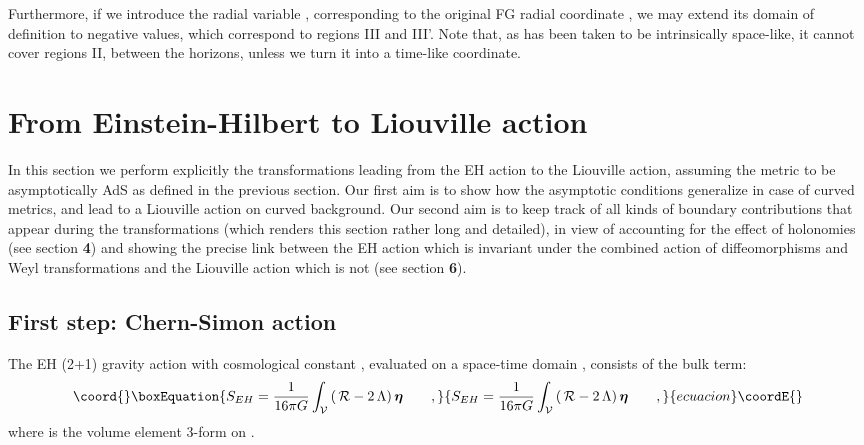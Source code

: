 \documentclass[a4paper,10pt]{article}
\begin{document}
Furthermore, if we introduce the radial variable 
\coordHE{}, corresponding to the original FG radial 
coordinate \cite{FG}, 
we may extend its domain of definition to  negative values, which 
correspond to  regions  III and III'. Note that, as \coordHE{} has been taken 
to be intrinsically space-like, it cannot cover regions II, between 
the horizons, unless we turn it into a time-like coordinate.  
  
\section{From Einstein-Hilbert to Liouville action} 

In this section we perform explicitly the transformations leading from
the EH action to the Liouville action, assuming the metric to be asymptotically
AdS as defined in the previous section. Our first aim is to show
how the asymptotic conditions generalize in case of curved metrics,
 and lead to a Liouville action on curved background.
Our second aim is to keep track of all kinds of boundary contributions
that appear during the 
transformations (which renders this section rather long and detailed), 
in view of accounting for the effect of holonomies (see section {\bf 4})
and showing the precise link between the
EH action which is invariant under the combined action
of diffeomorphisms and Weyl transformations and the Liouville action 
which is not (see section {\bf 6}). 

\subsection{First step: Chern-Simon action}

The EH (2+1) gravity action with cosmological  
constant \myHighlight{$\Lambda$}\coordHE{}, evaluated on a space-time domain \coordHE{}, 
consists of the bulk term: 
\begin{equation}\coord{}\boxEquation{ 
\label{SEH} 
S_{EH}=\frac 1 {16 \pi G} \int_{\cal V} \,  
   ( \, { \cal R} - 2 \, \Lambda ) 
       \, \boldsymbol{\eta} 
\qquad ,  
}{ 
S_{EH}=\frac 1 {16 \pi G} \int_{\cal V} \,  
   ( \, { \cal R} - 2 \, \Lambda ) 
       \, \boldsymbol{\eta} 
\qquad ,  
}{ecuacion}\coordE{}\end{equation} 
where \myHighlight{$\boldsymbol{\eta}$}\coordHE{} is the volume element 3-form on \coordHE{}. 
 
\end{document}
